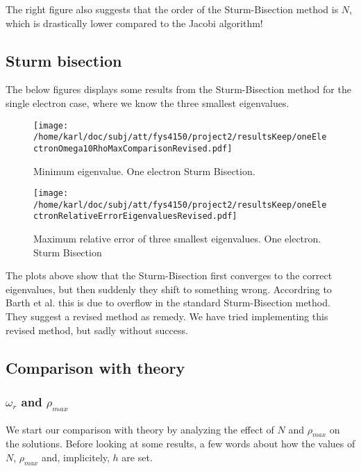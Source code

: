 \documentclass{article}
\begin{document}
The right figure also suggests that the order of the Sturm-Bisection method is $N$, which is drastically lower compared to the Jacobi algorithm! 



\subsection{Sturm bisection}
The below figures displays some results from the Sturm-Bisection method for the single electron case, where we know the three smallest eigenvalues.

\begin{minipage}{.49\textwidth} %
	\begin{figure}[H]
		\centering
		\texttt{[image: /home/karl/doc/subj/att/fys4150/project2/resultsKeep/oneElectronOmega10RhoMaxComparisonRevised.pdf]}
		\caption{Minimum eigenvalue. One electron Sturm Bisection.}
		\label{1}
	\end{figure}
\end{minipage}\hfill
\begin{minipage}{.49\textwidth}
	\begin{figure}[H]
		\centering
		\texttt{[image: /home/karl/doc/subj/att/fys4150/project2/resultsKeep/oneElectronRelativeErrorEigenvaluesRevised.pdf]}
		\caption{Maximum relative error of three smallest eigenvalues. One electron. Sturm Bisection}
		\label{1}
	\end{figure}
\end{minipage}\hfill
\vspace{2ex}

The plots above show that the Sturm-Bisection first converges to the correct eigenvalues, but then suddenly they shift to something wrong. Accordring to Barth et al. \cite{barth} this is due to overflow in the standard Sturm-Bisection method. They suggest a revised method as remedy. We have tried implementing this revised method, but sadly without success.


\subsection{Comparison with theory}

\subsubsection{$\omega_r$ and $\rho_{max}$}
We start our comparison with theory by analyzing the effect of $N$ and $\rho_{max}$ on the solutions. Before looking at some results, a few words about how the values of $N$, $\rho_{max}$ and, implicitely, $h$ are set.\\
\end{document}
